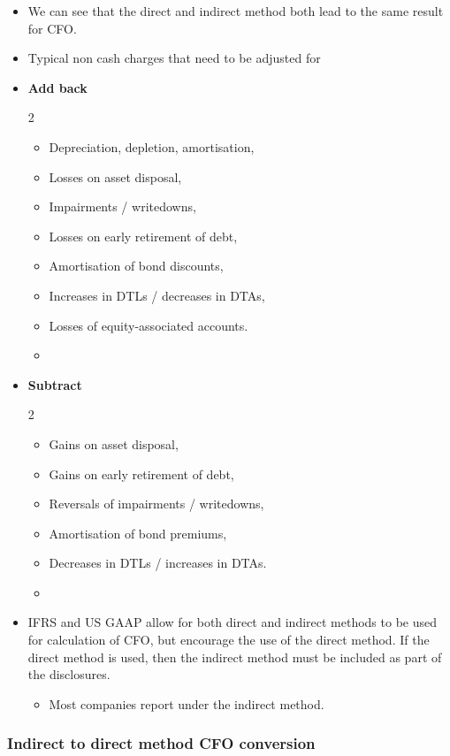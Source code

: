 \documentclass[../notes_compiled.tex]{subfiles}
\begin{document}
\begin{itemize}
\item We can see that the direct and indirect method both lead to the same result for CFO.
\item Typical non cash charges that need to be adjusted for
\item[] \textbf{Add back}
\begin{multicols}{2}
\begin{itemize}
\item Depreciation, depletion, amortisation,
\item Losses on asset disposal,
\item Impairments / writedowns,
\item Losses on early retirement of debt,
\item Amortisation of bond discounts,
\item Increases in DTLs / decreases in DTAs,
\item Losses of equity-associated accounts.
\item[]
\end{itemize}
\end{multicols}
\item[] \textbf{Subtract}
\begin{multicols}{2}
\begin{itemize}
\item Gains on asset disposal,
\item Gains on early retirement of debt,
\item Reversals of impairments / writedowns,
\item Amortisation of bond premiums,
\item Decreases in DTLs / increases in DTAs.
\item[]
\end{itemize}
\end{multicols}
\item IFRS and US GAAP allow for both direct and indirect methods to be used for calculation of CFO, but encourage the use of the direct method. If the direct method is used, then the indirect method must be included as part of the disclosures.
\begin{itemize}
\item Most companies report under the indirect method.
\end{itemize}
\end{itemize}

\subsubsection{Indirect to direct method CFO conversion}
\end{document}
